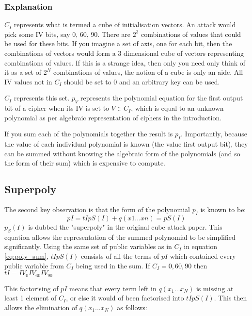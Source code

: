 \documentclass{report}
\let\Oldsubsection\subsection
\renewcommand{\subsection}{\FloatBarrier\Oldsubsection}
\let\Oldsubsubsection\subsubsection
\renewcommand{\subsubsection}{\FloatBarrier\Oldsubsubsection}
\begin{document}
\subsubsection{Explanation}
$C_I$ represents what is termed a cube of initialisation vectors. An attack would pick some IV bits, say 0, 60, 90. There are $2^3$ combinations of values that could be used for these bits. If you imagine a set of axis, one for each bit, then the combinations of vectors would form a 3 dimensional cube of vectors representing combinations of values. If this is a strange idea, then only you need only think of it as a set of $2^N$ combinations of values, the notion of a cube is only an aide. All IV values not in $C_I$ should be set to 0 and an arbitrary key can be used.

$C_I$ represents this set. $p_V$ represents the polynomial equation for the first output bit of a cipher when its IV is set to $V \in C_I$, which is equal to an unknown polynomial as per algebraic representation of ciphers in the introduction.

If you sum each of the polynomials together the result is $p_I$. Importantly, because the value of each individual polynomial is known (the value first output bit), they can be summed without knowing the algebraic form of the polynomials (and so the form of their sum) which is expensive to compute.

\subsection{Superpoly}
The second key observation is that the form of the polynomial $p_I$ is known to be:
\begin{equation} \label{eq:GFpowers}
pI = tIpS(I)+q(x1...xn)=pS(I)
\end{equation}
$p_S(I)$ is dubbed the "superpoly" in the original cube attack paper. This equation allows the representation of the summed polynomial to be simplified significantly. Using the same set of public variables as in $C_I$ in equation 
\ref{eq:poly_sum}, $tIpS(I)$ consists of all the terms of $pI$ which contained  every public variable from $C_I$ being used in the sum. If $C_I={0, 60, 90}$ then  $tI = IV_{0}IV_{60}IV_{90}$

This factorising of $pI$ means that every term left in $q(x_1...x_N)$ is missing at least 1 element of $C_I$, or else it would of been factorised into $tIpS(I)$. This then allows the elimination of $q(x_1...x_N)$ as follows:
\end{document}
